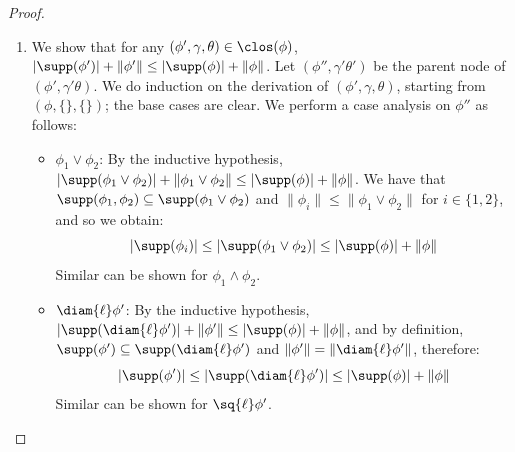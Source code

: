 \begin{proof}
\begin{enumerate}
\begin{itemize}
\[			\]
			and by Lemma~\ref{lem:unionOrb2}:
						\[
			\orb[\Ncal](\clos_\phi((\mu X(\vec x).\psi')(\vec a),\gamma, \theta)) \subseteq \{((\mu X(\vec x).\psi')(\vec a),\gamma, \theta)\} \cup \orb[\Ncal](\clos_\phi(\hat \psi,(\gamma, \{\vec a/\vec x\}), \theta'))
			\]
			By the inductive hypothesis, we have:
			\[
			|\orb[\Ncal](\clos_\phi(\hat \psi,(\gamma, \{\vec a/\vec x\}) \theta'))| \le |\hat \psi|\cdot m'   (\hat \psi,(\gamma, \{\vec a/\vec x\}),\theta')
			\]
			We note that
			$m'(\hat \psi,(\gamma, \{\vec a/\vec x\}),\theta') = m'(\psi,\gamma,\theta)$, thus obtaining:
						\begin{align*}
				|\orb[\Ncal](\clos_\phi(\psi,\gamma, \theta))| &\le |\orb[\Ncal](\clos_\phi(\hat \psi,(\gamma, \{\vec a/\vec x\})\theta'))| + 1
				\\ &\overset{\text{IH}}{\le} |\hat \psi|\cdot m'(\hat \psi) + 1
				\\ &\leq (|\vec x| + |\psi'|)\cdot m'(\psi,\gamma,\theta) + 1
				\leq |\psi|\cdot m'(\psi,\gamma,\theta)
			\end{align*}
			A similar argument can be shown for $(\nu X(\vec x).\psi')(\vec a)$.
		\end{itemize}
		\item    We show that for any $(\phi',\gamma, \theta) \in \clos(\phi)$, $|\supp(\phi')| + \|\phi'\| \le |\supp(\phi)| + \|\phi\|$.
				Let $(\phi'',\gamma'\theta')$ be the parent node of $(\phi',\gamma' \theta)$.
		We do induction on the derivation of $(\phi',\gamma, \theta)$, starting from $(\phi,\{\}, \{\})$; the base cases are clear.
		We perform a case analysis on $\phi''$ as follows:
		\begin{itemize}
			\item $\phi_1 \lor \phi_2$: 
			By the inductive hypothesis, $|\supp(\phi_1 \lor \phi_2)| + \|\phi_1 \lor \phi_2\| \le |\supp(\phi)| + \|\phi\|$. 
			We have that $\supp(\phi_1,\phi_2) \subseteq \supp(\phi_1 \lor \phi_2)$ and $\|\phi_i\| \le \|\phi_1 \lor \phi_2\|$ for $i \in \{1,2\}$, and so we obtain:
			\[
			|\supp(\phi_i)| \le |\supp(\phi_1 \lor \phi_2)| \le  |\supp(\phi)| + \|\phi\|
			\]
			Similar can be shown for $\phi_1 \land \phi_2$.
						\item $\diam{\ell} \phi'$: By the inductive hypothesis, $|\supp(\diam{\ell}\phi')| + \|\phi'\| \le |\supp(\phi)| + \|\phi\|$, and by definition, $\supp(\phi')\subseteq \supp(\diam{\ell}\phi')$ and $\|\phi'\| = \|\diam{\ell}\phi'\|$, therefore:
			\[
			|\supp(\phi')| \le |\supp(\diam{\ell}\phi')| \le |\supp(\phi)| + \|\phi\|
			\]
			Similar can be shown for $\sq{\ell} \phi'$.

\end{itemize}
\end{enumerate}
\end{proof}
